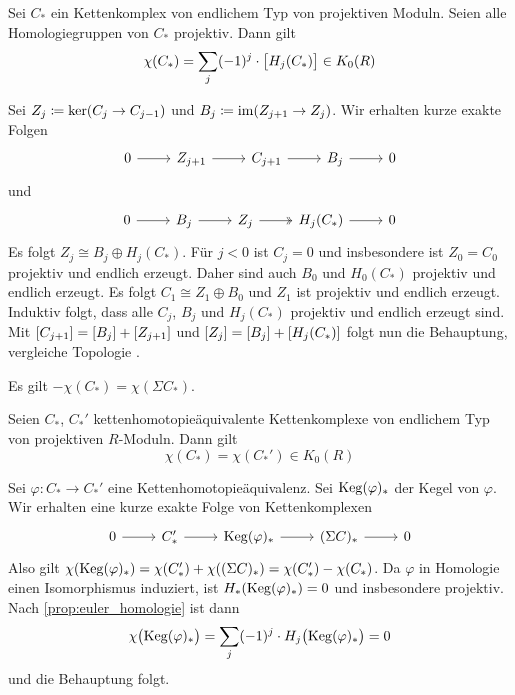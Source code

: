 \begin{proposition}[label=prop:euler_homologie]
    Sei $C_*$ ein Kettenkomplex von endlichem Typ von projektiven Moduln.
    Seien alle Homologiegruppen von $C_*$ projektiv.
    Dann gilt 
    \[
        \chi(C_*) = \sum_j (-1)^j \cdot \benbrace[\big]{H_j(C_*)} \in K_0(R)
    \] 
\end{proposition}
\begin{beweis}
    Sei $Z_j \coloneqq \ker  \enbrace*{C_j \to C_{j-1}}$ und $B_j \coloneqq \im \enbrace*{Z_{j+1} \to Z_j}$.
    Wir erhalten kurze exakte Folgen
    \[
        \begin{tikzcd}
            0 \rar & Z_{j+1} \rar & C_{j+1} \rar & B_j \rar & 0
        \end{tikzcd}
    \]
    und 
    \[
        \begin{tikzcd}
            0 \rar & B_j \rar & Z_j \rar[two heads] & H_j(C_*) \rar & 0
        \end{tikzcd}
    \]
    Es folgt $Z_j \cong B_j \oplus H_j(C_*)$.
    Für $j<0$ ist $C_j=0$ und insbesondere ist $Z_0 =C_0$ projektiv und endlich erzeugt.
    Daher sind auch $B_0$ und $H_0(C_*)$ projektiv und endlich erzeugt.
    Es folgt $C_1 \cong Z_1 \oplus B_0$ und $Z_1$ ist projektiv und endlich erzeugt.
    Induktiv folgt, dass alle $C_j$, $B_j$ und $H_j(C_*)$ projektiv und endlich erzeugt sind.
    Mit $\benbrace*{C_{j+1}} = \benbrace*{B_j} + \benbrace*{Z_{j+1}}$ und $\benbrace*{Z_j} = \benbrace*{B_j} + \benbrace*{H_j(C_*)}$ folgt nun die Behauptung, vergleiche Topologie .
\end{beweis}

\begin{bemerkung}
    Es gilt $-\chi(C_*) = \chi (\Sigma C_*)$.
\end{bemerkung}

\begin{proposition}[label=prop:euler_invariant_kettenhomotopie]
    Seien $C_*$, $C_*'$ kettenhomotopieäquivalente Kettenkomplexe von endlichem Typ von projektiven $R$-Moduln.
    Dann gilt 
    \[
        \chi(C_*) = \chi(C_*') \in K_0(R)
    \]
\end{proposition}
\begin{beweis}
    Sei $\varphi \colon C_* \to C_*'$ eine Kettenhomotopieäquivalenz.
    Sei $\Keg(\varphi)_*$ der Kegel von $\varphi$.
    Wir erhalten eine kurze exakte Folge von Kettenkomplexen
    \[
        \begin{tikzcd}
            0 \rar & C_*' \rar & \Keg(\varphi)_* \rar & (\Sigma C)_* \rar & 0
        \end{tikzcd}
    \]
    Also gilt $\chi(\Keg(\varphi)_*) = \chi(C_*') + \chi((\Sigma C)_*) = \chi(C_*') - \chi(C_*)$.
    Da $\varphi$ in Homologie einen Isomorphismus induziert, ist $H_*(\Keg(\varphi)_*)=0$ und insbesondere projektiv.
    Nach \autoref{prop:euler_homologie} ist dann 
    \[
        \chi \enbrace[\big]{\Keg(\varphi)_*} = \sum_j (-1)^j \cdot  H_j \enbrace[\big]{\Keg(\varphi)_*} =0
    \]
    und die Behauptung folgt.
\end{beweis}

